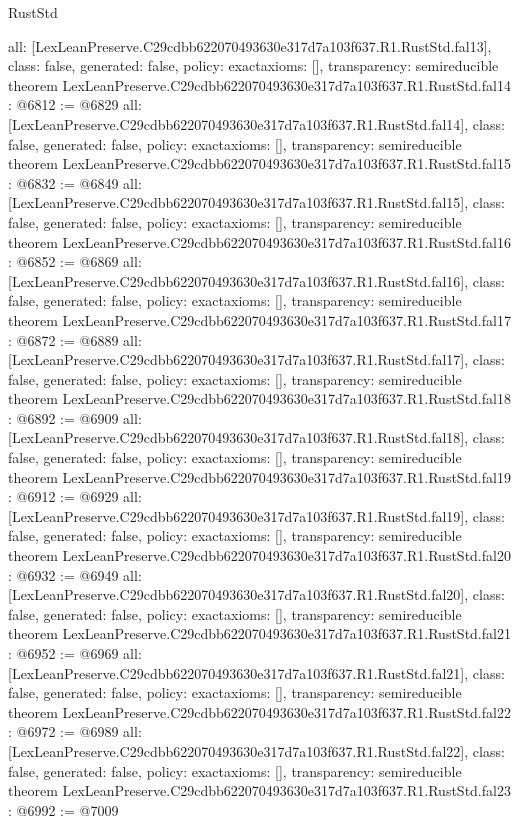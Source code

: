 \begin{lexlean}{RustStd}
\begin{coremodule}
{  all: [LexLeanPreserve.C29cdbb622070493630e317d7a103f637.R1.RustStd.fal13],
  class: false,
  generated: false,
  policy: exact{axioms: []},
  transparency: semireducible
}
theorem LexLeanPreserve.C29cdbb622070493630e317d7a103f637.R1.RustStd.fal14 : @6812 := @6829 {
  all: [LexLeanPreserve.C29cdbb622070493630e317d7a103f637.R1.RustStd.fal14],
  class: false,
  generated: false,
  policy: exact{axioms: []},
  transparency: semireducible
}
theorem LexLeanPreserve.C29cdbb622070493630e317d7a103f637.R1.RustStd.fal15 : @6832 := @6849 {
  all: [LexLeanPreserve.C29cdbb622070493630e317d7a103f637.R1.RustStd.fal15],
  class: false,
  generated: false,
  policy: exact{axioms: []},
  transparency: semireducible
}
theorem LexLeanPreserve.C29cdbb622070493630e317d7a103f637.R1.RustStd.fal16 : @6852 := @6869 {
  all: [LexLeanPreserve.C29cdbb622070493630e317d7a103f637.R1.RustStd.fal16],
  class: false,
  generated: false,
  policy: exact{axioms: []},
  transparency: semireducible
}
theorem LexLeanPreserve.C29cdbb622070493630e317d7a103f637.R1.RustStd.fal17 : @6872 := @6889 {
  all: [LexLeanPreserve.C29cdbb622070493630e317d7a103f637.R1.RustStd.fal17],
  class: false,
  generated: false,
  policy: exact{axioms: []},
  transparency: semireducible
}
theorem LexLeanPreserve.C29cdbb622070493630e317d7a103f637.R1.RustStd.fal18 : @6892 := @6909 {
  all: [LexLeanPreserve.C29cdbb622070493630e317d7a103f637.R1.RustStd.fal18],
  class: false,
  generated: false,
  policy: exact{axioms: []},
  transparency: semireducible
}
theorem LexLeanPreserve.C29cdbb622070493630e317d7a103f637.R1.RustStd.fal19 : @6912 := @6929 {
  all: [LexLeanPreserve.C29cdbb622070493630e317d7a103f637.R1.RustStd.fal19],
  class: false,
  generated: false,
  policy: exact{axioms: []},
  transparency: semireducible
}
theorem LexLeanPreserve.C29cdbb622070493630e317d7a103f637.R1.RustStd.fal20 : @6932 := @6949 {
  all: [LexLeanPreserve.C29cdbb622070493630e317d7a103f637.R1.RustStd.fal20],
  class: false,
  generated: false,
  policy: exact{axioms: []},
  transparency: semireducible
}
theorem LexLeanPreserve.C29cdbb622070493630e317d7a103f637.R1.RustStd.fal21 : @6952 := @6969 {
  all: [LexLeanPreserve.C29cdbb622070493630e317d7a103f637.R1.RustStd.fal21],
  class: false,
  generated: false,
  policy: exact{axioms: []},
  transparency: semireducible
}
theorem LexLeanPreserve.C29cdbb622070493630e317d7a103f637.R1.RustStd.fal22 : @6972 := @6989 {
  all: [LexLeanPreserve.C29cdbb622070493630e317d7a103f637.R1.RustStd.fal22],
  class: false,
  generated: false,
  policy: exact{axioms: []},
  transparency: semireducible
}
theorem LexLeanPreserve.C29cdbb622070493630e317d7a103f637.R1.RustStd.fal23 : @6992 := @7009 {
}
\end{coremodule}
\end{lexlean}

